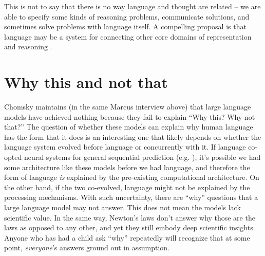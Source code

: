 \documentclass[output=paper,colorlinks,citecolor=brown
]{langscibook}
\begin{document}
This is not to say that there is no way language and thought are related -- we are able to specify some kinds of reasoning problems, communicate solutions, and sometimes solve problems with language itself. A compelling proposal is that language may be a system for connecting other core domains of representation and reasoning \citep{spelke2003makes}. %


\section{Why this and not that}

Chomsky maintains (in the same Marcus interview above) that large language models have achieved nothing because they fail to explain  ``Why this?  Why not that?'' The question of whether these models can explain why human language has the form that it does is an interesting one that likely depends on whether the language system evolved before language or concurrently with it. If language co-opted neural systems for general sequential prediction (e.g. \citealt{christiansen2015language}), it's possible we had some architecture like these models before we had language, and therefore the form of language \textit{is} explained by the pre-existing computational architecture. On the other hand, if the two co-evolved, language might not be explained by the processing mechanisms. With such uncertainty,  there are ``why'' questions that a large language model may not answer. This does not mean the models lack scientific value. In the same way, Newton's laws don't answer why those are the laws as opposed to any other, and yet they still embody deep scientific insights. Anyone who has had a child ask ``why'' repeatedly will recognize that at some point, \textit{everyone}'s answers ground out in assumption. 
\end{document}
